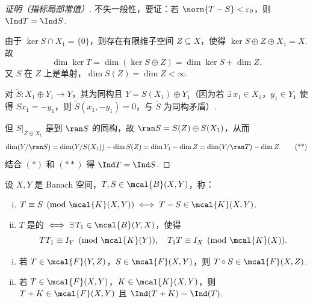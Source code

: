 
\begin{proof}[证明（指标局部常值）]
不失一般性，要证：若 $\norm{T-S}<\varepsilon_0$，则 $\Ind T = \Ind S$.\par
由于 $\ker S \cap X_1 = \{0\}$，则存在有限维子空间 $Z \subseteq X$，使得 $\ker S \oplus Z \oplus X_1 = X$.
故
\begin{equation}
\dim \ker T = \dim(\ker S \oplus Z) = \dim \ker S + \dim Z. \tag{*}
\end{equation}
又 $S$ 在 $Z$ 上是单射，$\dim S(Z) = \dim Z < \infty$.\par
对 $\widetilde{S}: X_1 \oplus Y_1 \to Y$，其为同构且 $Y = S(X_1) \oplus Y_1$（因为若 $\exists\, x_1 \in X_1$，$y_1 \in Y_1$ 使得 $Sx_1 = -y_1$，则 $\widetilde{S}(x_1,-y_1)=0$，与 $\widetilde{S}$ 为同构矛盾）.\par
但 $S|_{Z \oplus X_1}$ 是到 $\ran S$ 的同构，故 $\ran S = S(Z) \oplus S(X_1)$，从而
\begin{equation}
\dim(Y/\ran S) = \dim(Y/S(X_1)) - \dim S(Z) = \dim Y_1 - \dim Z = \dim(Y/\ran T) - \dim Z. \tag{**}
\end{equation}
结合 $(*)$ 和 $(**)$ 得 $\Ind T = \Ind S$.
\end{proof}

\begin{definition}[模紧算子等价]
设 $X,Y$ 是 Banach 空间，$T,S \in \mcal{B}(X,Y)$，称：
\begin{enumerate}[(i)]
    \item $T \equiv S \pmod{\mcal{K}(X,Y)} \iff T-S \in \mcal{K}(X,Y)$.
    \item $T$ 是的 $\iff \exists\, T_1 \in \mcal{B}(Y,X)$，使得
    \begin{equation*}
    TT_1 \equiv I_Y \pmod{\mcal{K}(Y)},\quad T_1T \equiv I_X \pmod{\mcal{K}(X)}.
    \end{equation*}
\end{enumerate}
\end{definition}

\begin{lemma}\label{lem:fredholm-composition}
\begin{enumerate}[(i)]
    \item 若 $T \in \mcal{F}(Y,Z)$，$S \in \mcal{F}(X,Y)$，则 $T \circ S \in \mcal{F}(X,Z)$.
    \item 若 $T \in \mcal{F}(X,Y)$，$K \in \mcal{K}(X,Y)$，则 $T+K \in \mcal{F}(X,Y)$ 且 $\Ind(T+K) = \Ind(T)$.
\end{enumerate}
\end{lemma}

